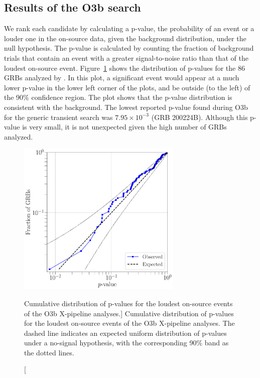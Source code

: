 \subsection{Results of the O3b search}\label{sec:grb-o3b-results}

We rank each candidate by calculating a p-value, the probability of an event or a louder one in the on-source data, given the background distribution, under the null hypothesis.
The p-value is calculated by counting the fraction of background trials that contain an event with a greater signal-to-noise ratio than that of the loudest on-source event.
Figure~\ref{fig:grb-o3b-x-pval} shows the distribution of p-values for the 86 \acp{GRB} analyzed by \xpip.
In this plot, a significant event would appear at a much lower p-value in the lower left corner of the plots, and be outside (to the left) of the 90\% confidence region.
The plot shows that the p-value distribution is consistent with the background.
The lowest reported p-value found during O3b for the generic transient search was $7.95\times 10^{-3}$ (GRB 200224B). Although this p-value is very small, it is not unexpected given the high number of GRBs analyzed.

\begin{figure}[h]
  \centering
  \includegraphics[width=0.7\textwidth]{figures/grb/o3b-x-pval.pdf}
  \caption
  [Cumulative distribution of p-values for the loudest on-source events of the O3b X-pipeline analyses.]
  {
    Cumulative distribution of p-values for the loudest on-source events of the O3b X-pipeline analyses.
    The dashed line indicates an expected uniform distribution of p-values under a no-signal hypothesis, with the corresponding 90\% band as the dotted lines.}
  \label{fig:grb-o3b-x-pval}
\end{figure}

